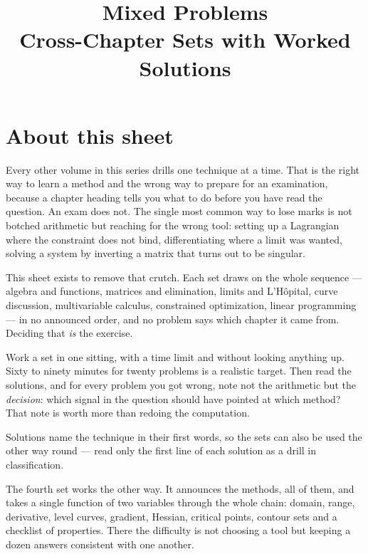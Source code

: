 \documentclass[10pt,oneside]{book}
\title{\Huge Mixed Problems\\[0.4em]
  \large Cross-Chapter Sets with Worked Solutions}
\author{}
\date{}
\begin{document}
\frontmatter
\maketitle

\chapter*{About this sheet}

Every other volume in this series drills one technique at a time. That is
the right way to learn a method and the wrong way to prepare for an
examination, because a chapter heading tells you what to do before you have
read the question. An exam does not. The single most common way to lose
marks is not botched arithmetic but reaching for the wrong tool: setting up
a Lagrangian where the constraint does not bind, differentiating where a
limit was wanted, solving a system by inverting a matrix that turns out to
be singular.

This sheet exists to remove that crutch. Each set draws on the whole
sequence --- algebra and functions, matrices and elimination, limits and
L'H\^opital, curve discussion, multivariable calculus, constrained
optimization, linear programming --- in no announced order, and no problem
says which chapter it came from. Deciding that \emph{is} the exercise.

Work a set in one sitting, with a time limit and without looking anything
up. Sixty to ninety minutes for twenty problems is a realistic target. Then
read the solutions, and for every problem you got wrong, note not the
arithmetic but the \emph{decision}: which signal in the question should have
pointed at which method? That note is worth more than redoing the
computation.

Solutions name the technique in their first words, so the sets can also be
used the other way round --- read only the first line of each solution as a
drill in classification.

The fourth set works the other way. It announces the methods, all of them,
and takes a single function of two variables through the whole chain:
domain, range, derivative, level curves, gradient, Hessian, critical
points, contour sets and a checklist of properties. There the difficulty is
not choosing a tool but keeping a dozen answers consistent with one
another.

\tableofcontents

\mainmatter




\end{document}
